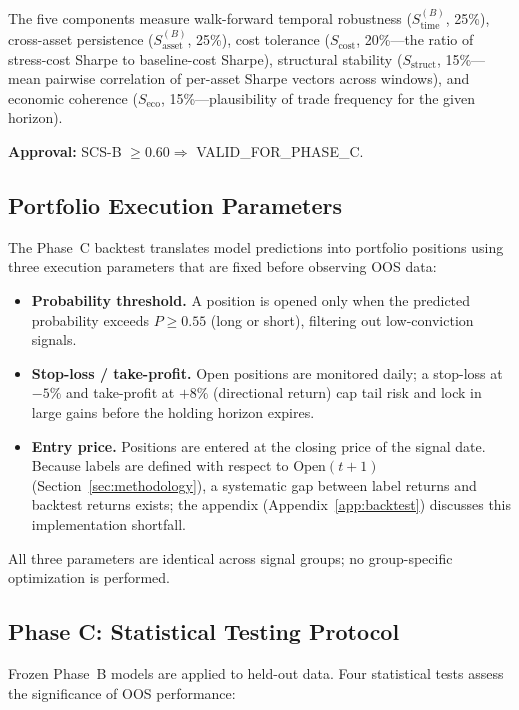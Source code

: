 \documentclass[12pt,a4paper]{article}
\begin{document}
The five components measure walk-forward temporal robustness ($S_{\text{time}}^{(B)}$, 25\%), cross-asset persistence ($S_{\text{asset}}^{(B)}$, 25\%), cost tolerance ($S_{\text{cost}}$, 20\%---the ratio of stress-cost Sharpe to baseline-cost Sharpe), structural stability ($S_{\text{struct}}$, 15\%---mean pairwise correlation of per-asset Sharpe vectors across windows), and economic coherence ($S_{\text{eco}}$, 15\%---plausibility of trade frequency for the given horizon).

\textbf{Approval:} SCS-B $\geq 0.60 \Rightarrow$ VALID\_FOR\_PHASE\_C.

\subsection{Portfolio Execution Parameters}
\label{sec:execution}

The Phase~C backtest translates model predictions into portfolio positions using three execution parameters that are fixed before observing OOS data:

\begin{itemize}
  \item \textbf{Probability threshold.} A position is opened only when the predicted probability exceeds $P \geq 0.55$ (long or short), filtering out low-conviction signals.
  \item \textbf{Stop-loss / take-profit.} Open positions are monitored daily; a stop-loss at $-5\%$ and take-profit at $+8\%$ (directional return) cap tail risk and lock in large gains before the holding horizon expires.
  \item \textbf{Entry price.} Positions are entered at the closing price of the signal date. Because labels are defined with respect to $\text{Open}(t{+}1)$ (Section~\ref{sec:methodology}), a systematic gap between label returns and backtest returns exists; the appendix (Appendix~\ref{app:backtest}) discusses this implementation shortfall.
\end{itemize}

All three parameters are identical across signal groups; no group-specific optimization is performed.

\subsection{Phase C: Statistical Testing Protocol}

Frozen Phase~B models are applied to held-out data. Four statistical tests assess the significance of OOS performance:
\end{document}
